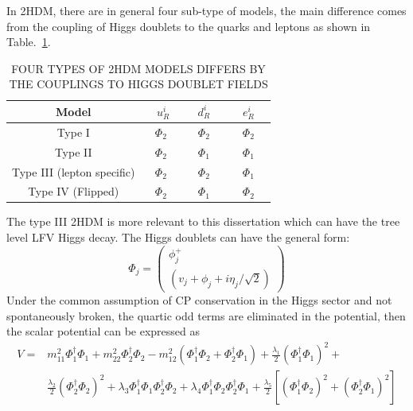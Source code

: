 In 2HDM, there are in general four sub-type of models, the main difference comes from the coupling of Higgs doublets to the quarks and leptons as shown in Table.~\ref{2HDM_models}.
\begin{table}[htp!]
\caption{FOUR TYPES OF 2HDM MODELS DIFFERS BY THE COUPLINGS TO HIGGS DOUBLET FIELDS}
\begin{center}
\begin{tabular}{|c|c|c|c|}
\hline
Model                                 &~  $u^{i}_{R}$~  &~  $d^{i}_{R}$ ~   &~   $e^{i}_{R}$ ~\\\hline
Type I                                 &  $\Phi_{2}$    &  $\Phi_{2}$     &  $\Phi_{2}$   \\\hline
Type II                                &  $\Phi_{2}$    &  $\Phi_{1}$     &  $\Phi_{1}$   \\\hline
Type III (lepton specific)     &  $\Phi_{2}$    &  $\Phi_{2}$     &  $\Phi_{1}$   \\\hline
Type IV (Flipped)                &  $\Phi_{2}$    &  $\Phi_{1}$     &  $\Phi_{2}$   \\\hline
\end{tabular}
\end{center}
\label{2HDM_models}
\end{table}
The type III 2HDM is more relevant to this dissertation which can have the tree level LFV Higgs decay. The Higgs doublets can have the general form:
\begin{equation}
\Phi_{j}=
\begin{pmatrix}
\phi^{+}_{j}    \\
(v_{j}+\phi_{j}+i\eta_{j}/\sqrt{2})
\end{pmatrix}
\end{equation}
Under the common assumption of CP conservation in the Higgs sector and not spontaneously broken, the quartic odd terms are eliminated in the potential, then the scalar potential can be expressed as
\begin{equation}
\begin{aligned}
V=&m^{2}_{11}\Phi^{\dagger}_{1}\Phi_{1}+m^{2}_{22}\Phi^{\dagger}_{2}\Phi_{2}-m^{2}_{12}(\Phi^{\dagger}_{1}\Phi_{2}+\Phi^{\dagger}_{2}\Phi_{1})+\frac{\lambda_{1}}{2}(\Phi^{\dagger}_{1}\Phi_{1})^{2}+\\
  &\frac{\lambda_{2}}{2}(\Phi^{\dagger}_{2}\Phi_{2})^{2}+\lambda_{3}\Phi^{\dagger}_{1}\Phi_{1}\Phi^{\dagger}_{2}\Phi_{2}+\lambda_{4}\Phi^{\dagger}_{1}\Phi_{2}\Phi^{\dagger}_{2}\Phi_{1}+\frac{\lambda_{5}}{2}[(\Phi^{\dagger}_{1}\Phi_{2})^{2}+(\Phi^{\dagger}_{2}\Phi_{1})^{2}]
  \end{aligned}
\end{equation}
